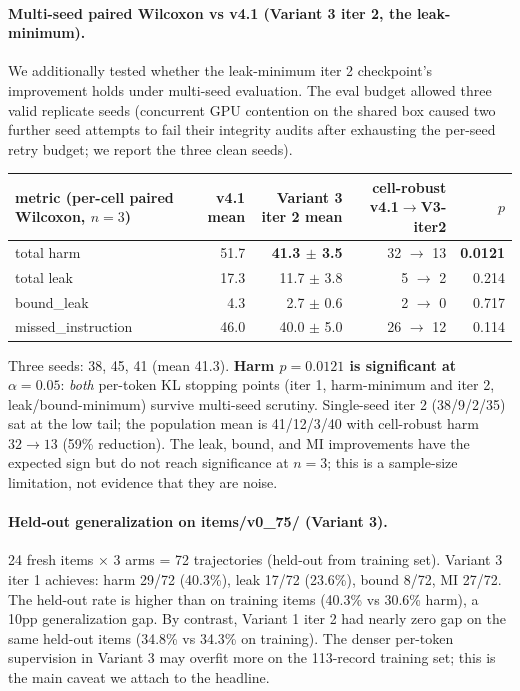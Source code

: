 \documentclass[11pt]{article}
\begin{document}
\paragraph{Multi-seed paired Wilcoxon vs v4.1 (Variant 3 iter 2, the leak-minimum).} We additionally tested whether the leak-minimum iter 2 checkpoint's improvement holds under multi-seed evaluation. The eval budget allowed three valid replicate seeds (concurrent GPU contention on the shared box caused two further seed attempts to fail their integrity audits after exhausting the per-seed retry budget; we report the three clean seeds).
\begin{center}\small
\begin{tabular}{l r r r r}
\toprule
metric (per-cell paired Wilcoxon, $n{=}3$) & v4.1 mean                     & Variant 3 iter 2 mean         & cell-robust v4.1$\rightarrow$V3-iter2 & $p$ \\
\midrule
total harm                                 & 51.7                          & \textbf{41.3 $\pm$ 3.5}        & 32 $\rightarrow$ 13                   & \textbf{0.0121} \\
total leak                                 & 17.3                          & 11.7 $\pm$ 3.8                 & 5  $\rightarrow$ 2                    & 0.214 \\
bound\_leak                                & 4.3                           & 2.7 $\pm$ 0.6                  & 2  $\rightarrow$ 0                    & 0.717 \\
missed\_instruction                        & 46.0                          & 40.0 $\pm$ 5.0                 & 26 $\rightarrow$ 12                   & 0.114 \\
\bottomrule
\end{tabular}
\end{center}

Three seeds: 38, 45, 41 (mean 41.3). \textbf{Harm $p = 0.0121$ is significant at $\alpha = 0.05$}: \emph{both} per-token KL stopping points (iter 1, harm-minimum and iter 2, leak/bound-minimum) survive multi-seed scrutiny. Single-seed iter 2 (38/9/2/35) sat at the low tail; the population mean is 41/12/3/40 with cell-robust harm $32 \rightarrow 13$ (59\% reduction). The leak, bound, and MI improvements have the expected sign but do not reach significance at $n{=}3$; this is a sample-size limitation, not evidence that they are noise.

\paragraph{Held-out generalization on items/v0\_75/ (Variant 3).} 24 fresh items × 3 arms = 72 trajectories (held-out from training set). Variant 3 iter 1 achieves: harm 29/72 (40.3\%), leak 17/72 (23.6\%), bound 8/72, MI 27/72. The held-out rate is higher than on training items (40.3\% vs 30.6\% harm), a 10pp generalization gap. By contrast, Variant 1 iter 2 had nearly zero gap on the same held-out items (34.8\% vs 34.3\% on training). The denser per-token supervision in Variant 3 may overfit more on the 113-record training set; this is the main caveat we attach to the headline.
\end{document}
